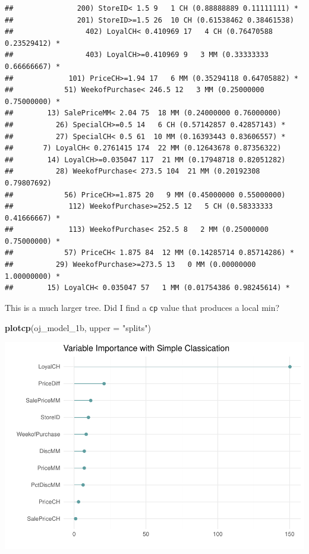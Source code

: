 \documentclass[
]{book}
\newenvironment{Shaded}{\begin{snugshade}}{\end{snugshade}}
\newcommand{\DataTypeTok}[1]{\textcolor[rgb]{0.13,0.29,0.53}{#1}}
\newcommand{\KeywordTok}[1]{\textcolor[rgb]{0.13,0.29,0.53}{\textbf{#1}}}
\newcommand{\NormalTok}[1]{#1}
\newcommand{\StringTok}[1]{\textcolor[rgb]{0.31,0.60,0.02}{#1}}
\begin{document}
\begin{verbatim}
##               200) StoreID< 1.5 9   1 CH (0.88888889 0.11111111) *
##               201) StoreID>=1.5 26  10 CH (0.61538462 0.38461538)  
##                 402) LoyalCH< 0.410969 17   4 CH (0.76470588 0.23529412) *
##                 403) LoyalCH>=0.410969 9   3 MM (0.33333333 0.66666667) *
##             101) PriceCH>=1.94 17   6 MM (0.35294118 0.64705882) *
##            51) WeekofPurchase< 246.5 12   3 MM (0.25000000 0.75000000) *
##        13) SalePriceMM< 2.04 75  18 MM (0.24000000 0.76000000)  
##          26) SpecialCH>=0.5 14   6 CH (0.57142857 0.42857143) *
##          27) SpecialCH< 0.5 61  10 MM (0.16393443 0.83606557) *
##       7) LoyalCH< 0.2761415 174  22 MM (0.12643678 0.87356322)  
##        14) LoyalCH>=0.035047 117  21 MM (0.17948718 0.82051282)  
##          28) WeekofPurchase< 273.5 104  21 MM (0.20192308 0.79807692)  
##            56) PriceCH>=1.875 20   9 MM (0.45000000 0.55000000)  
##             112) WeekofPurchase>=252.5 12   5 CH (0.58333333 0.41666667) *
##             113) WeekofPurchase< 252.5 8   2 MM (0.25000000 0.75000000) *
##            57) PriceCH< 1.875 84  12 MM (0.14285714 0.85714286) *
##          29) WeekofPurchase>=273.5 13   0 MM (0.00000000 1.00000000) *
##        15) LoyalCH< 0.035047 57   1 MM (0.01754386 0.98245614) *
\end{verbatim}

This is a much larger tree. Did I find a \texttt{cp} value that produces a local min?

\begin{Shaded}
\begin{Highlighting}[]
\KeywordTok{plotcp}\NormalTok{(oj_model_1b, }\DataTypeTok{upper =} \StringTok{"splits"}\NormalTok{)}
\end{Highlighting}
\end{Shaded}

\includegraphics{data-sci_files/figure-latex/unnamed-chunk-35-1.pdf}
\end{document}
